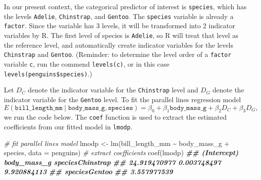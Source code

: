 \documentclass[
]{book}
\newenvironment{Shaded}{\begin{snugshade}}{\end{snugshade}}
\newcommand{\AttributeTok}[1]{\textcolor[rgb]{0.77,0.63,0.00}{#1}}
\newcommand{\CommentTok}[1]{\textcolor[rgb]{0.56,0.35,0.01}{\textit{#1}}}
\newcommand{\DocumentationTok}[1]{\textcolor[rgb]{0.56,0.35,0.01}{\textbf{\textit{#1}}}}
\newcommand{\FunctionTok}[1]{\textcolor[rgb]{0.00,0.00,0.00}{#1}}
\newcommand{\NormalTok}[1]{#1}
\newcommand{\OtherTok}[1]{\textcolor[rgb]{0.56,0.35,0.01}{#1}}
\newcommand{\SpecialCharTok}[1]{\textcolor[rgb]{0.00,0.00,0.00}{#1}}
\theoremstyle{definition}
\theoremstyle{definition}
\theoremstyle{definition}
\theoremstyle{definition}
\theoremstyle{remark}
\begin{document}
In our present context, the categorical predictor of interest is \texttt{species}, which has the levels \texttt{Adelie}, \texttt{Chinstrap}, and \texttt{Gentoo}. The \texttt{species} variable is already a \texttt{factor}. Since the variable has 3 levels, it will be transformed into 2 indicator variables by R. The first level of species is \texttt{Adelie}, so R will treat that level as the reference level, and automatically create indicator variables for the levels \texttt{Chinstrap} and \texttt{Gentoo}. (Reminder: to determine the level order of a \texttt{factor} variable \texttt{c}, run the commend \texttt{levels(c)}, or in this case \texttt{levels(penguins\$species)}.)

Let \(D_C\) denote the indicator variable for the \texttt{Chinstrap} level and \(D_G\) denote the indicator variable for the \texttt{Gentoo} level. To fit the parallel lines regression model
\[E(\mathtt{bill\_length\_mm} \mid \mathtt{body\_mass\_g}, \mathtt{species}) = \beta_{0} + \beta_1 \mathtt{body\_mass\_g} + \beta_2 D_C + \beta_3 D_G,\]
we run the code below. The \texttt{coef} function is used to extract the estimated coefficients from our fitted model in \texttt{lmodp}.

\begin{Shaded}
\begin{Highlighting}[]
\CommentTok{\# fit parallel lines model}
\NormalTok{lmodp }\OtherTok{\textless{}{-}} \FunctionTok{lm}\NormalTok{(bill\_length\_mm }\SpecialCharTok{\textasciitilde{}}\NormalTok{ body\_mass\_g }\SpecialCharTok{+}\NormalTok{ species, }\AttributeTok{data =}\NormalTok{ penguins)}
\CommentTok{\# extract coefficients}
\FunctionTok{coef}\NormalTok{(lmodp)}
\DocumentationTok{\#\#      (Intercept)      body\_mass\_g speciesChinstrap }
\DocumentationTok{\#\#     24.919470977      0.003748497      9.920884113 }
\DocumentationTok{\#\#    speciesGentoo }
\DocumentationTok{\#\#      3.557977539}
\end{Highlighting}
\end{Shaded}
\end{document}
